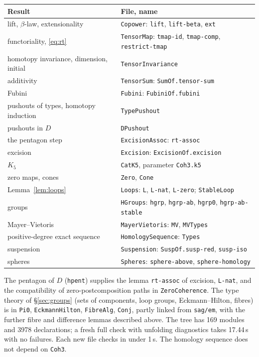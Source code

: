\documentclass[11pt]{amsart}
\numberwithin{equation}{section}
\theoremstyle{definition}
\theoremstyle{remark}
\newcommand{\code}[1]{\texttt{#1}}
\begin{document}
\begin{center}
\begin{tabular}{>{\raggedright}p{6.2cm}l}
\toprule
Result & File, name \\
\midrule
lift, $\beta$-law, extensionality & \code{Copower}: \code{lift}, \code{lift-beta}, \code{ext}\\
functoriality, \eqref{eq:rt} & \code{TensorMap}: \code{tmap-id}, \code{tmap-comp}, \code{restrict-tmap}\\
homotopy invariance, dimension, initial & \code{TensorInvariance}\\
additivity & \code{TensorSum}: \code{SumOf.tensor-sum}\\
Fubini & \code{Fubini}: \code{FubiniOf.fubini}\\
pushouts of types, homotopy induction & \code{TypePushout}\\
pushouts in $D$ & \code{DPushout}\\
the pentagon step & \code{ExcisionAssoc}: \code{rt-assoc}\\
excision & \code{Excision}: \code{ExcisionOf.excision}\\
$K_5$ & \code{CatK5}, parameter \code{Coh3.k5}\\
zero maps, cones & \code{Zero}, \code{Cone}\\
Lemma~\ref{lem:loops} & \code{Loops}: \code{L}, \code{L-nat}, \code{L-zero}; \code{StableLoop}\\
groups & \code{HGroups}: \code{hgrp}, \code{hgrp-ab}, \code{hgrp0}, \code{hgrp-ab-stable}\\
Mayer--Vietoris & \code{MayerVietoris}: \code{MV}, \code{MVTypes}\\
positive-degree exact sequence & \code{HomologySequence}: \code{Types}\\
suspension & \code{Suspension}: \code{SuspOf.susp-red}, \code{susp-iso}\\
spheres & \code{Spheres}: \code{sphere-above}, \code{sphere-homology}\\
\bottomrule
\end{tabular}
\end{center}

\noindent The pentagon of $D$ (\code{hpent}) supplies the
lemma \code{rt-assoc} of excision, \code{L-nat}, and the compatibility
of zero-postcomposition paths in \code{ZeroCoherence}. The type theory of
\S\ref{sec:groups} (sets of components, loop groups, Eckmann--Hilton, fibres) is in
\code{Pi0}, \code{EckmannHilton}, \code{FibreAlg}, \code{Conj}, partly linked from
\code{sag/em}, with the further fibre and difference lemmas described
above. The tree has 169 modules and 3978 declarations; a fresh full
check with unfolding diagnostics takes 17.44\,s with no failures.
Each new file checks in under 1\,s. The homology sequence does not
depend on \code{Coh3}.
\end{document}
